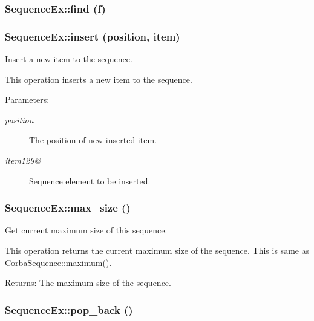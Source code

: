 \subsubsection{\setlength{\rightskip}{0pt plus 5cm}Sequence\-Ex::find (f)}\label{classSequenceEx_SequenceExa11}


\subsubsection{\setlength{\rightskip}{0pt plus 5cm}Sequence\-Ex::insert (position, item)}\label{classSequenceEx_SequenceExa6}


Insert a new item to the sequence. 

This operation inserts a new item to the sequence. \begin{Desc}
\item[Parameters:]
\begin{description}
\item[{\em position}]The position of new inserted item. \item[{\em item129@}]Sequence element to be inserted.\end{description}
\end{Desc}
\subsubsection{\setlength{\rightskip}{0pt plus 5cm}Sequence\-Ex::max\_\-size ()}\label{classSequenceEx_SequenceExa3}


Get current maximum size of this sequence. 

This operation returns the current maximum size of the sequence. This is same as Corba\-Sequence::maximum(). \begin{Desc}
\item[Returns:]The maximum size of the sequence.\end{Desc}
\subsubsection{\setlength{\rightskip}{0pt plus 5cm}Sequence\-Ex::pop\_\-back ()}\label{classSequenceEx_SequenceExa10}


